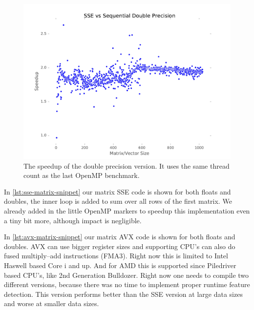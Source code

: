 \documentclass[final]{report}
\begin{document}
\begin{figure}[H]
\centering
    \includegraphics[width=\linewidth]{resources/sse-dp.pdf}
    \caption{The speedup of the double precision version. It uses the same thread count as the last OpenMP benchmark.}
    \label{fig:sse-dp}
\end{figure}

In \cref{lst:sse-matrix-snippet} our matrix SSE code is shown for both floats and doubles, the inner loop is added to sum over all rows of the first matrix. We already added in the little OpenMP markers to speedup this implementation even a tiny bit more, although impact is negligible.

In \cref{lst:avx-matrix-snippet} our matrix AVX code is shown for both floats and doubles.
AVX can use bigger register sizes and supporting CPU's can also do fused multiply–add instructions (FMA3).
Right now this is limited to Intel Haswell based Core i and up.
And for AMD this is supported since Piledriver based CPU's, like 2nd Generation Bulldozer. 
Right now one needs to compile two different versions, because there was no time to implement proper runtime feature detection.
This version performs better than the SSE version at large data sizes and worse at smaller data sizes. 

\end{document}
